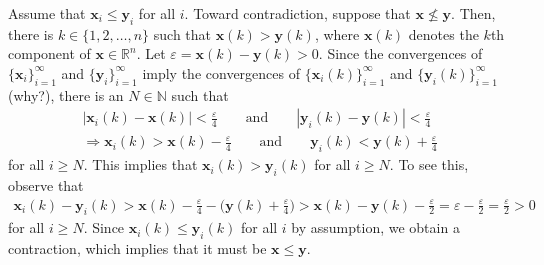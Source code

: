 \documentclass[letterpaper,10pt,english]{jupyterBook}
\begin{document}
\sphinxAtStartPar
Assume that \(\mathbf{x}_i \leq \mathbf{y}_i\) for all \(i\).
Toward contradiction, suppose that \(\mathbf{x} \nleq \mathbf{y}\).
Then, there is \(k\in\{1, 2, \dots, n\}\) such that \(\mathbf{x}(k) > \mathbf{y}(k)\), where \(\mathbf{x}(k)\) denotes the \(k\)\sphinxhyphen{}th component of \(\mathbf{x} \in \mathbb{R}^n\).
Let \(\varepsilon = \mathbf{x}(k) - \mathbf{y}(k) > 0\).
Since the convergences of \(\{\mathbf{x}_i\}_{i=1}^\infty\) and \(\{\mathbf{y}_i\}_{i=1}^\infty\) imply the convergences of \(\{\mathbf{x}_i(k)\}_{i=1}^\infty\) and \(\{\mathbf{y}_i(k)\}_{i=1}^\infty\) (why?),
there is an \(N\in\mathbb{N}\) such that
\begin{equation*}
\begin{split}
|\mathbf{x}_i(k) - \mathbf{x}(k)| < \frac{\varepsilon}{4} \qquad \text{and} \qquad |\mathbf{y}_i(k) - \mathbf{y}(k)| < \frac{\varepsilon}{4} \\
\Rightarrow \mathbf{x}_i(k) > \mathbf{x}(k) - \frac{\varepsilon}{4}  \qquad \text{and} \qquad \mathbf{y}_i(k) < \mathbf{y}(k) + \frac{\varepsilon}{4}
\end{split}
\end{equation*}
\sphinxAtStartPar
for all \(i \geq N\).
This implies that \(\mathbf{x}_i(k) > \mathbf{y}_i(k)\) for all \(i \geq N\).
To see this, observe that
\begin{equation*}
\begin{split}
\mathbf{x}_i(k) - \mathbf{y}_i(k) > \mathbf{x}(k) - \frac{\varepsilon}{4} -  \Big(\mathbf{y}(k) +\frac{\varepsilon}{4}\Big)> \mathbf{x}(k) - \mathbf{y}(k) -\frac{\varepsilon}{2} = \varepsilon - \frac{\varepsilon}{2} = \frac{\varepsilon}{2}> 0
\end{split}
\end{equation*}
\sphinxAtStartPar
for all \(i \geq N\).
Since \(\mathbf{x}_i(k)\leq \mathbf{y}_i(k)\) for all \(i\) by assumption, we obtain a contraction, which implies that it must be \(\mathbf{x} \leq \mathbf{y}\).

\sphinxAtStartPar
{}
\end{document}
